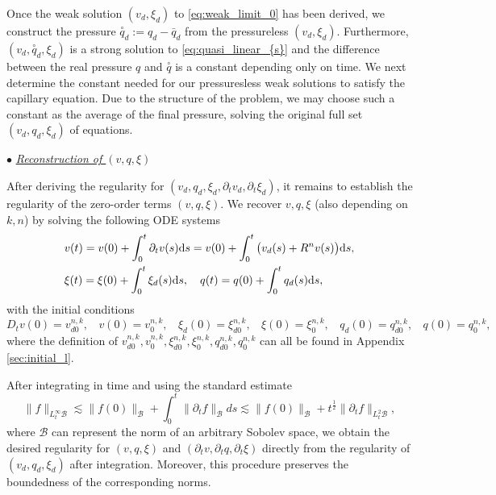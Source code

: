 \documentclass[letterpaper,reqno,10pt,twoside]{amsart}
\theoremstyle{definition}
\theoremstyle{remark}
\def\dt{\partial_t}
\def\p{\partial}
\begin{document}
	Once the weak solution $(v_{d},\xi_{d})$ to \eqref{eq:weak_limit_0} has been derived, we construct the pressure $\overset{\circ}q_{d}:=q_{d}-\bar{q}_{d}$ from the pressureless $(v_{d},\xi_{d})$. Furthermore, $(v_{d}, \overset{\circ}q_{d}
	, \xi_{d})$ is a strong solution to \eqref{eq:quasi_linear_{s}} and the difference between the real
	pressure $q$ and $\overset{\circ}q$
	is a constant depending only on time. We next determine the constant needed for our pressuresless weak solutions to satisfy the capillary equation.  Due to the structure of the problem, we may choose such a constant as the average of the final pressure, solving the original full set $(v_{d},q_{d},\xi_{d})$ of equations.
	
	\noindent $\bullet$ \underline{\textsl{Reconstruction of $(v,q,\xi)$}}
	
	After deriving the regularity for $(v_{d},q_{d},\xi_{d},\p_{t}v_{d},\p_{t}\xi_{d})$, it remains to establish the regularity of the zero-order terms $(v,q,\xi)$.  We recover $v,q,\xi$ (also depending on $k,n$) by solving the following ODE systems
	\begin{align}{\label{eq:ODE}}
		\begin{aligned}
			&v(t)=v(0)+\int_0^t\dt v(s)\mathrm{d} s=v(0)+\int_0^t\big(v_d(s)+R^{n}v(s)\big)\mathrm{d}s,\\   &\xi(t)=\xi(0)+\int_{0}^{t}\xi_d(s)\mathrm{d}s,\quad
			q(t)=q(0)+\int_{0}^{t}q_d(s)\mathrm{d}s,
		\end{aligned}
	\end{align}
	\noindent with the initial conditions
	\[
	D_{t}v(0)=v^{n,k}_{d0},~~~~v(0)=v_{0}^{n,k},~~~~\xi_{d}(0)=\xi_{d0}^{n,k},~~~~\xi(0)=\xi_{0}^{n,k},~~~~q_{d}(0)=q_{d0}^{n,k},~~~~q(0)=q_{0}^{n,k},
	\]
	\noindent where the definition of $v_{d0}^{n,k},v_{0}^{n,k},\xi^{n,k}_{d0},\xi_{0}^{n,k},q_{d0}^{n,k},q_{0}^{n,k}$ can all be found in Appendix \ref{sec:initial_l}.
	
	After integrating in time and using the standard estimate
	\[
	\|f\|_{L_{t}^{\infty}\mathcal{B}}\lesssim \|f(0)\|_{\mathcal{B}}+\int_{0}^{t}\|\p_{t}f\|_{\mathcal{B}}ds\lesssim \|f(0)\|_\mathcal{B}+t^{\frac{1}{2}}\|\p_{t}f\|_{L_{t}^{2}\mathcal{B}},
	\]
	where $\mathcal{B}$ can represent the norm of an arbitrary Sobolev space, we obtain the desired regularity for $(v,q,\xi)$ and $(\partial_{t}v,\partial_{t}q,\partial_{t}\xi)$ directly from the regularity of $(v_{d},q_{d},\xi_{d})$ after integration. Moreover, this procedure preserves the boundedness of the corresponding norms.
	
\end{document}
